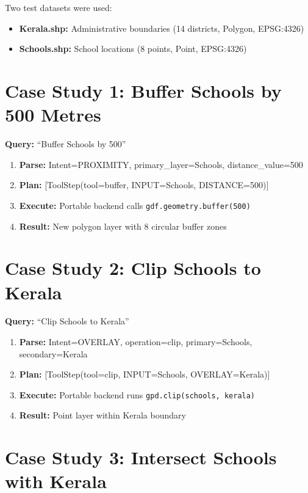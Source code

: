 \documentclass[12pt,a4paper]{report}
\begin{document}
Two test datasets were used:

\begin{itemize}
  \item \textbf{Kerala.shp:} Administrative boundaries (14 districts, Polygon, EPSG:4326)
  \item \textbf{Schools.shp:} School locations (8 points, Point, EPSG:4326)
\end{itemize}

\section{Case Study 1: Buffer Schools by 500 Metres}

\textbf{Query:} ``Buffer Schools by 500''

\begin{enumerate}
  \item \textbf{Parse:} Intent=PROXIMITY, primary\_layer=Schools, distance\_value=500
  \item \textbf{Plan:} [ToolStep(tool=buffer, INPUT=Schools, DISTANCE=500)]
  \item \textbf{Execute:} Portable backend calls \texttt{gdf.geometry.buffer(500)}
  \item \textbf{Result:} New polygon layer with 8 circular buffer zones
\end{enumerate}

\section{Case Study 2: Clip Schools to Kerala}

\textbf{Query:} ``Clip Schools to Kerala''

\begin{enumerate}
  \item \textbf{Parse:} Intent=OVERLAY, operation=clip, primary=Schools, secondary=Kerala
  \item \textbf{Plan:} [ToolStep(tool=clip, INPUT=Schools, OVERLAY=Kerala)]
  \item \textbf{Execute:} Portable backend runs \texttt{gpd.clip(schools, kerala)}
  \item \textbf{Result:} Point layer within Kerala boundary
\end{enumerate}

\section{Case Study 3: Intersect Schools with Kerala}
\end{document}
